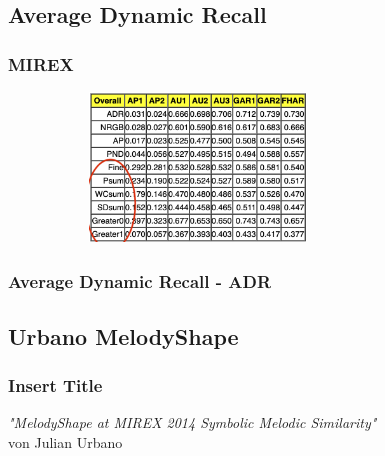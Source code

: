\documentclass{beamer}
\begin{document}
	\subsection{Average Dynamic Recall}

	
	\begin{frame}
		\frametitle{MIREX}
		\begin{figure}[h!]
			\includegraphics[width=300px,height=150px,keepaspectratio]{mirex_result_example_change_two}
		\end{figure}
	\end{frame}

	\begin{frame}
		\frametitle{Average Dynamic Recall - ADR}
		
	\end{frame}
	
	\subsection{Urbano MelodyShape}
	\begin{frame}
		\frametitle{Insert Title }
		\begin{minipage}{0.45\textwidth}
			\begin{center}
				\textit{"MelodyShape at MIREX 2014 Symbolic Melodic Similarity"} 
				\cite{fi ve_point_two}  \\ 
				von Julian Urbano
			\end{center}
		\end{minipage}%
		\begin{minipage}{0.45\textwidth}
			\begin{figure}[h!]
			\end{figure}
		\end{minipage}
	\end{frame}
	
\end{document}
